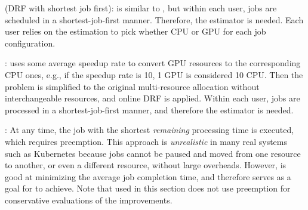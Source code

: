 	
\emph{\DRFSJF} (DRF with shortest job first): \DRFSJF is similar to \DRFFIFO, but within each user, jobs are scheduled in a shortest-job-first manner. Therefore, the estimator is needed. Each user relies on the estimation to pick whether CPU or GPU for each job configuration. 



\emph{\DRFExt}: \DRFExt uses some average speedup rate to convert GPU resources to the corresponding CPU ones, e.g., if the speedup rate is 10, 1 GPU is considered 10 CPU. %
Then the problem is simplified to the original multi-resource allocation without interchangeable resources, and online DRF is applied. 
Within each user, jobs are processed in a shortest-job-first manner, and therefore the estimator is needed.

\emph{\SRPT}: At any time, the job with the shortest \emph{remaining} processing time is executed, which requires preemption. This approach is \emph{unrealistic} in many real systems such as Kubernetes because jobs cannot be paused and moved from one resource to another, or even a different resource, without large overheads.
However, \SRPT is good at minimizing the average job completion time, and therefore serves as a goal for \name to achieve. Note that \name used in this section does not use preemption for conservative evaluations of the improvements. 



